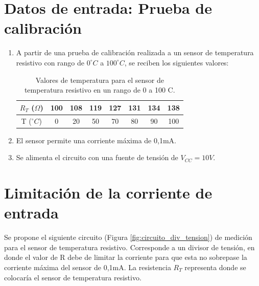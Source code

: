 \documentclass[journal,trans]{IEEEtran}
\begin{document}



\section{Datos de entrada: Prueba de calibración}
\begin{enumerate}
    \item A partir de una prueba de calibración realizada a un sensor de temperatura resistivo con rango de $0^{\circ}C$ a $100^{\circ}C$, se reciben los siguientes valores:

\begin{table}[htb]
    \begin{center}
        \caption{Valores de temperatura para el sensor de temperatura resistivo en un rango de 0 a 100 C.}
        \label{tab:prueba_calibracion}
        \begin{tabular}{c | c | c | c | c | c | c | c}
            \hline
            $R_{T}$ ($\Omega$) & 100 & 108 & 119 & 127 & 131 & 134 & 138 \\
            \hline
            T ($^{\circ}C$) & 0 & 20 & 50 & 70 & 80 & 90 & 100  \\
            \hline
        \end{tabular}
    \end{center}
\end{table}

    \item El sensor permite una corriente máxima de 0,1mA.

    \item Se alimenta el circuito con una fuente de tensión de $V_{CC} = 10 V$.

\end{enumerate}

\section{Limitación de la corriente de entrada}
Se propone el siguiente circuito (Figura \ref{fig:circuito_div_tension}) de medición para el sensor de temperatura resistivo. Corresponde a un divisor de tensión, en donde el valor de R debe de limitar la corriente para que esta no sobrepase la corriente máxima del sensor de 0,1mA. La resistencia $R_{T}$ representa donde se colocaría el sensor de temperatura resistivo.
\end{document}
